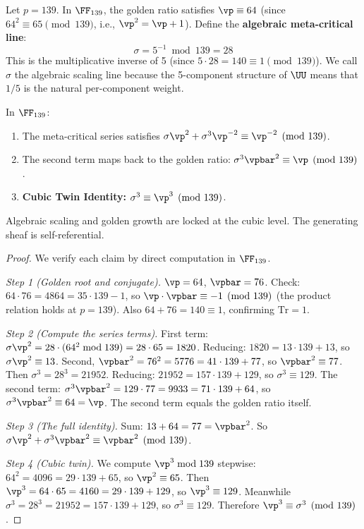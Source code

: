 \begin{definition}\label{def:sigma}
Let $p = 139$. In $\FF_{139}$, the golden ratio satisfies $\vp \equiv 64$ (since $64^2 \equiv 65 \pmod{139}$, i.e., $\vp^2 = \vp + 1$). Define the \textbf{algebraic meta-critical line}:
$$\sigma = 5^{-1} \bmod{139} = 28$$
This is the multiplicative inverse of 5 (since $5 \cdot 28 = 140 \equiv 1 \pmod{139}$). We call $\sigma$ the algebraic scaling line because the 5-component structure of $\UU$ means that $1/5$ is the natural per-component weight.
\end{definition}

\begin{theorem}\label{thm:metacritical}
In $\FF_{139}$:
\begin{enumerate}
\item The meta-critical series satisfies $\sigma \vp^2 + \sigma^3 \vp^{-2} \equiv \vp^{-2} \pmod{139}$.
\item The second term maps back to the golden ratio: $\sigma^3 \vpbar^2 \equiv \vp \pmod{139}$.
\item \textbf{Cubic Twin Identity:} $\sigma^3 \equiv \vp^3 \pmod{139}$.
\end{enumerate}
Algebraic scaling and golden growth are locked at the cubic level. The generating sheaf is self-referential.
\end{theorem}

\begin{proof}
We verify each claim by direct computation in $\FF_{139}$.

\emph{Step 1 (Golden root and conjugate).} $\vp = 64$, $\vpbar = 76$. Check: $64 \cdot 76 = 4864 = 35 \cdot 139 - 1$, so $\vp \cdot \vpbar \equiv -1 \pmod{139}$ (the product relation holds at $p = 139$). Also $64 + 76 = 140 \equiv 1$, confirming $\mathrm{Tr} = 1$.

\emph{Step 2 (Compute the series terms).} First term: $\sigma \vp^2 = 28 \cdot (64^2 \bmod 139) = 28 \cdot 65 = 1820$. Reducing: $1820 = 13 \cdot 139 + 13$, so $\sigma \vp^2 \equiv 13$. Second, $\vpbar^2 = 76^2 = 5776 = 41 \cdot 139 + 77$, so $\vpbar^2 \equiv 77$. Then $\sigma^3 = 28^3 = 21952$. Reducing: $21952 = 157 \cdot 139 + 129$, so $\sigma^3 \equiv 129$. The second term: $\sigma^3 \vpbar^2 = 129 \cdot 77 = 9933 = 71 \cdot 139 + 64$, so $\sigma^3 \vpbar^2 \equiv 64 = \vp$. The second term equals the golden ratio itself.

\emph{Step 3 (The full identity).} Sum: $13 + 64 = 77 = \vpbar^2$. So $\sigma\vp^2 + \sigma^3\vpbar^2 \equiv \vpbar^2 \pmod{139}$.

\emph{Step 4 (Cubic twin).} We compute $\vp^3 \bmod 139$ stepwise: $64^2 = 4096 = 29 \cdot 139 + 65$, so $\vp^2 \equiv 65$. Then $\vp^3 = 64 \cdot 65 = 4160 = 29 \cdot 139 + 129$, so $\vp^3 \equiv 129$. Meanwhile $\sigma^3 = 28^3 = 21952 = 157 \cdot 139 + 129$, so $\sigma^3 \equiv 129$. Therefore $\vp^3 \equiv \sigma^3 \pmod{139}$. \qedhere
\end{proof}

